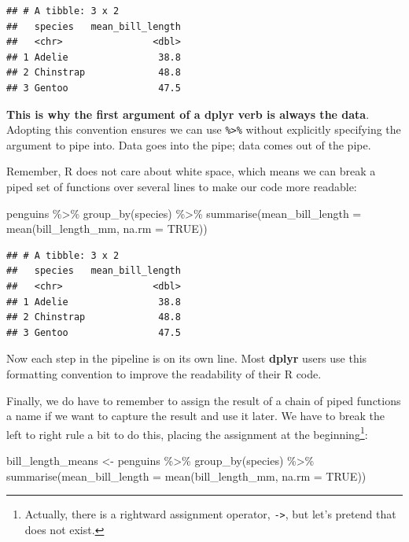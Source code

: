 \documentclass[
]{book}
\newenvironment{Shaded}{\begin{snugshade}}{\end{snugshade}}
\newcommand{\AttributeTok}[1]{\textcolor[rgb]{0.77,0.63,0.00}{#1}}
\newcommand{\ConstantTok}[1]{\textcolor[rgb]{0.00,0.00,0.00}{#1}}
\newcommand{\FunctionTok}[1]{\textcolor[rgb]{0.00,0.00,0.00}{#1}}
\newcommand{\NormalTok}[1]{#1}
\newcommand{\OtherTok}[1]{\textcolor[rgb]{0.56,0.35,0.01}{#1}}
\newcommand{\SpecialCharTok}[1]{\textcolor[rgb]{0.00,0.00,0.00}{#1}}
\begin{document}
\begin{verbatim}
## # A tibble: 3 x 2
##   species   mean_bill_length
##   <chr>                <dbl>
## 1 Adelie                38.8
## 2 Chinstrap             48.8
## 3 Gentoo                47.5
\end{verbatim}

\textbf{This is why the first argument of a dplyr verb is always the data}. Adopting this convention ensures we can use \texttt{\%\textgreater{}\%} without explicitly specifying the argument to pipe into. Data goes into the pipe; data comes out of the pipe.

Remember, R does not care about white space, which means we can break a piped set of functions over several lines to make our code more readable:

\begin{Shaded}
\begin{Highlighting}[]
\NormalTok{penguins }\SpecialCharTok{\%\textgreater{}\%} 
  \FunctionTok{group\_by}\NormalTok{(species) }\SpecialCharTok{\%\textgreater{}\%} 
  \FunctionTok{summarise}\NormalTok{(}\AttributeTok{mean\_bill\_length =} \FunctionTok{mean}\NormalTok{(bill\_length\_mm, }\AttributeTok{na.rm =} \ConstantTok{TRUE}\NormalTok{))}
\end{Highlighting}
\end{Shaded}

\begin{verbatim}
## # A tibble: 3 x 2
##   species   mean_bill_length
##   <chr>                <dbl>
## 1 Adelie                38.8
## 2 Chinstrap             48.8
## 3 Gentoo                47.5
\end{verbatim}

Now each step in the pipeline is on its own line. Most \textbf{dplyr} users use this formatting convention to improve the readability of their R code.

Finally, we do have to remember to assign the result of a chain of piped functions a name if we want to capture the result and use it later. We have to break the left to right rule a bit to do this, placing the assignment at the beginning\footnote{Actually, there is a rightward assignment operator, \texttt{-\textgreater{}}, but let's pretend that does not exist.}:

\begin{Shaded}
\begin{Highlighting}[]
\NormalTok{bill\_length\_means }\OtherTok{\textless{}{-}} 
\NormalTok{  penguins }\SpecialCharTok{\%\textgreater{}\%} 
  \FunctionTok{group\_by}\NormalTok{(species) }\SpecialCharTok{\%\textgreater{}\%} 
  \FunctionTok{summarise}\NormalTok{(}\AttributeTok{mean\_bill\_length =} \FunctionTok{mean}\NormalTok{(bill\_length\_mm, }\AttributeTok{na.rm =} \ConstantTok{TRUE}\NormalTok{))}
\end{Highlighting}
\end{Shaded}
\end{document}
